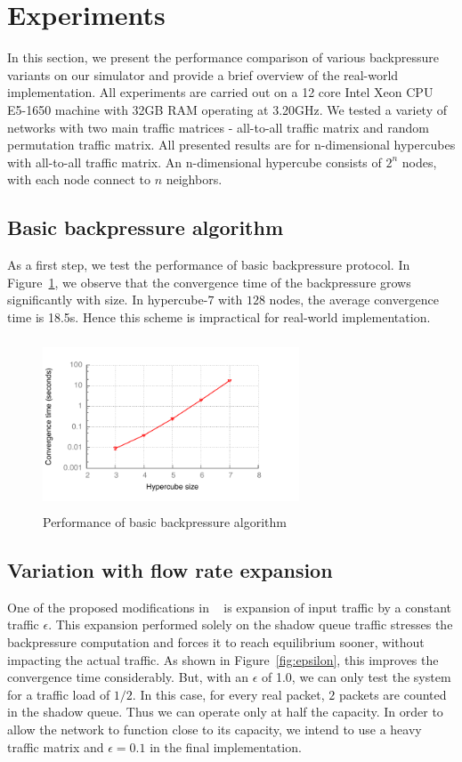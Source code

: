\label{experiments}
\section{Experiments}

In this section, we present the performance comparison of various backpressure variants on our simulator and provide a brief overview of the real-world implementation. All experiments are carried out on a 12 core Intel Xeon CPU E5-1650 machine with 32GB RAM operating at 3.20GHz. We tested a variety of networks with two main traffic matrices - all-to-all traffic matrix and random permutation traffic matrix. All presented results are for n-dimensional hypercubes with all-to-all traffic matrix. An n-dimensional hypercube consists of $2^{n}$ nodes, with each node connect to $n$ neighbors.

\subsection{Basic backpressure algorithm}
As a first step, we test the performance of basic backpressure protocol. In Figure~\ref{fig:basic}, we observe that the convergence time of the backpressure grows significantly with size. In hypercube-$7$ with $128$ nodes, the average convergence time is 18.5s. Hence this scheme is impractical for real-world implementation.
\begin{figure}
\centering
\includegraphics[width=3in, height=2in]{./figures/basic.pdf}
\caption{\small Performance of basic backpressure algorithm}
\label{fig:basic}
\end{figure}

\subsection{Variation with flow rate expansion}
One of the proposed modifications in ~\cite{Srikant3} is expansion of input traffic by a constant traffic $\epsilon$. This expansion performed solely on the shadow queue traffic stresses the backpressure computation and forces it to reach equilibrium sooner, without impacting the actual traffic. As shown in Figure~\ref{fig:epsilon}, this improves the convergence time considerably. But, with an $\epsilon$ of 1.0, we can only test the system for a traffic load of $1/2$. In this case, for every real packet, $2$ packets are counted in the shadow queue. Thus we can operate only at half the capacity. In order to allow the network to function close to its capacity, we intend to use a heavy traffic matrix and $\epsilon = 0.1$  in the final implementation.

